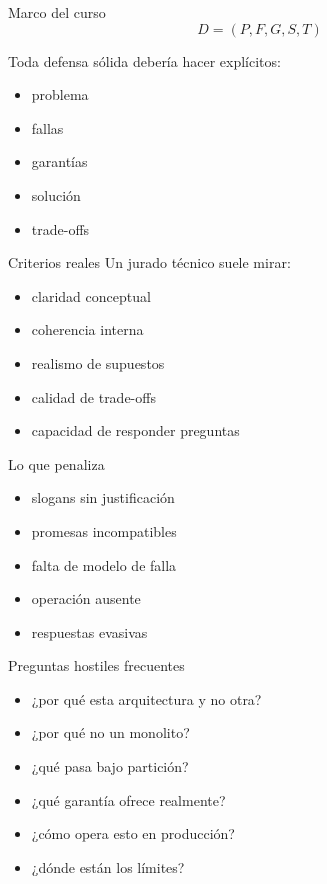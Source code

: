 \documentclass[institutional,screen,none]{ua-engineering-v6-beamer}
\begin{document}
\begin{frame}{Marco del curso}
\[
D = (P, F, G, S, T)
\]

\pause

Toda defensa sólida debería hacer explícitos:
\begin{itemize}
\item problema
\item fallas
\item garantías
\item solución
\item trade-offs
\end{itemize}
\end{frame}


\begin{frame}{Criterios reales}
Un jurado técnico suele mirar:
\begin{itemize}
\item claridad conceptual
\item coherencia interna
\item realismo de supuestos
\item calidad de trade-offs
\item capacidad de responder preguntas
\end{itemize}
\end{frame}

\begin{frame}{Lo que penaliza}
\begin{itemize}
\item slogans sin justificación
\item promesas incompatibles
\item falta de modelo de falla
\item operación ausente
\item respuestas evasivas
\end{itemize}
\end{frame}


\begin{frame}{Preguntas hostiles frecuentes}
\begin{itemize}
\item ¿por qué esta arquitectura y no otra?
\item ¿por qué no un monolito?
\item ¿qué pasa bajo partición?
\item ¿qué garantía ofrece realmente?
\item ¿cómo opera esto en producción?
\item ¿dónde están los límites?
\end{itemize}
\end{frame}
\end{document}
